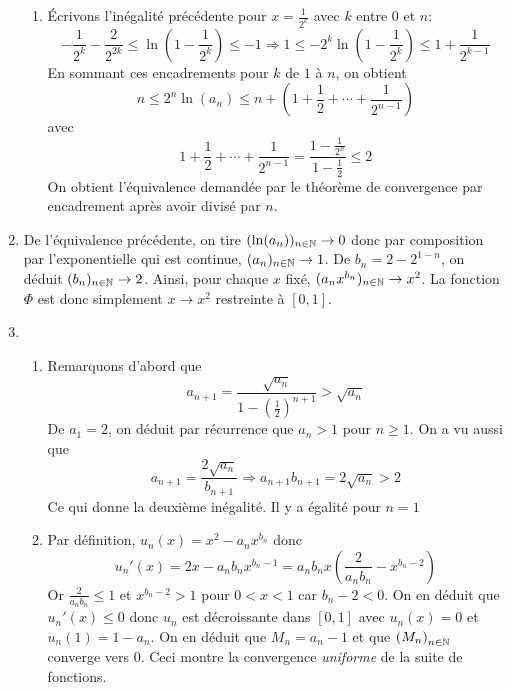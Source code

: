 \begin{enumerate}
\begin{enumerate}
 \item \'Ecrivons l'inégalité précédente pour $x=\frac{1}{2^k}$ avec $k$ entre $0$ et $n$:
\begin{displaymath}
 -\frac{1}{2^k} -\frac{2}{2^{2k}}\leq \ln(1-\frac{1}{2^k})\leq-1
\Rightarrow
1\leq -2^k\ln(1-\frac{1}{2^k})\leq 1 + \frac{1}{2^{k-1}}
\end{displaymath}
En sommant ces encadrements pour $k$ de $1$ à $n$, on obtient
\begin{displaymath}
 n \leq 2^n\ln(a_n)\leq n + \left(1+\frac{1}{2}+\cdots+\frac{1}{2^{n-1}} \right) 
\end{displaymath}
avec
\begin{displaymath}
 1+\frac{1}{2}+\cdots+\frac{1}{2^{n-1}} = \frac{1-\frac{1}{2^n}}{1-\frac{1}{2}}\leq 2
\end{displaymath}
On obtient l'équivalence demandée par le théorème de convergence par encadrement après avoir divisé par $n$.
\end{enumerate}
 \item De l'équivalence précédente, on tire $(\ln(a_n))_{n\in\mathbb{N}}\rightarrow 0$ donc par composition par l'exponentielle qui est continue, $(a_n)_{n\in\mathbb{N}} \rightarrow 1$. De $b_n=2-2^{1-n}$, on déduit $(b_n)_{n\in\mathbb{N}}\rightarrow 2$. Ainsi, pour chaque $x$ fixé, $(a_nx^{b_n})_{n\in\mathbb{N}}\rightarrow x^2$. La fonction $\Phi$ est donc simplement $x\rightarrow x^2$ restreinte à $[0,1]$.
 \item
\begin{enumerate}
 \item Remarquons d'abord que
\begin{displaymath}
 a_{n+1} = \frac{\sqrt{a_n}}{1-(\frac{1}{2})^{n+1}}>\sqrt{a_n}
\end{displaymath}
De $a_1=2$, on déduit par récurrence que $a_n>1$ pour $n\geq 1$. On a vu aussi que 
\begin{displaymath}
 a_{n+1}=\frac{2\sqrt{a_n}}{b_{n+1}}\Rightarrow a_{n+1}b_{n+1} = 2\sqrt{a_n}>2
\end{displaymath}
Ce qui donne la deuxième inégalité. Il y a égalité pour $n=1$
 \item Par définition, $u_n(x)=x^2 - a_nx^{b_n}$ donc
\begin{displaymath}
 u_n'(x)=2x-a_nb_nx^{b_n-1}=a_nb_nx\left(\frac{2}{a_nb_n}-x^{b_n-2} \right) 
\end{displaymath}
Or $\frac{2}{a_nb_n}\leq 1$ et $x^{b_n-2}>1$ pour $0<x<1$ car $b_n-2<0$. On en déduit que $u_n'(x)\leq 0$ donc $u_n$ est décroissante dans $[0,1]$ avec $u_n(x)=0$ et $u_n(1)=1-a_n$. On en déduit que $M_n=a_n-1$ et que $\left( M_n\right) _{n\in \mathbb{N}}$ converge vers $0$.\newline
Ceci montre la convergence \emph{uniforme} de la suite de fonctions.
\end{enumerate}

\end{enumerate}
